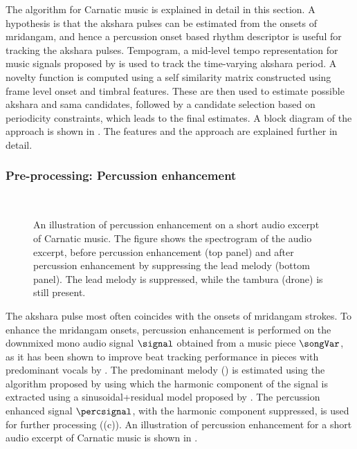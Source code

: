 The algorithm for Carnatic music is explained in detail in this section. A hypothesis is that the \gls{akshara} pulses can be estimated from the onsets of mridangam, and hence a percussion onset based rhythm descriptor \cite{bello:05:onset} is useful for tracking the \gls{akshara} pulses. Tempogram, a mid-level tempo representation for music signals proposed by  is used to track the time-varying \gls{akshara} period. A novelty function is computed using a self similarity matrix constructed using frame level onset and timbral features. These are then used to estimate possible \gls{akshara} and \gls{sama} candidates, followed by a candidate selection based on periodicity constraints, which leads to the final estimates. A block diagram of the approach is shown in . The features and the approach are explained further in detail. 
%
\subsubsection{Pre-processing: Percussion enhancement}
\begin{figure}
\captionsetup[subfigure]{labelformat=empty}
\centering
     \\ \vspace{-2em}
\caption[An illustration of percussion enhancement]{An illustration of percussion enhancement on a short audio excerpt of Carnatic music. The figure shows the spectrogram of the audio excerpt, before percussion enhancement (top panel) and after percussion enhancement by suppressing the lead melody (bottom panel). The lead melody is suppressed, while the \gls{tambura} (drone) is still present.}\label{fig:preproc:hpss}
\end{figure}
The \gls{akshara} pulse most often coincides with the onsets of mridangam strokes. To enhance the mridangam onsets, percussion enhancement is performed on the downmixed mono audio signal $\signal$ obtained from a music piece $\songVar$, as it has been shown to improve beat tracking performance in pieces with predominant vocals by . The predominant melody (\fzero) is estimated using the algorithm proposed by  using which the harmonic component of the signal is extracted using a sinusoidal+residual model proposed by . The percussion enhanced signal $\percsignal$, with the harmonic component suppressed, is used for further processing ((c)). An illustration of percussion enhancement for a short audio excerpt of Carnatic music is shown in . 
%
